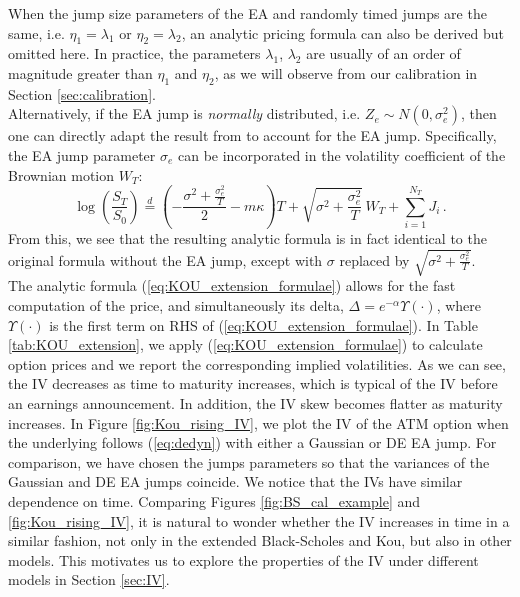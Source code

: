 \documentclass[11pt]{article}
\numberwithin{equation}{section}
\numberwithin{theorem}{section}
\begin{document}
\vspace{10pt}

When the jump size parameters of the EA and randomly timed jumps are the same, i.e. $\eta_{1}=\lambda_{1}$ or $\eta_{2}=\lambda_{2}$, an analytic pricing formula can also be  derived but omitted here. In practice, the   parameters $\lambda_1$, $\lambda_2$ are usually  of an order of magnitude greater
than $\eta_1$ and $\eta_2$, as we will observe from our  calibration in Section \ref{sec:calibration}. \\



 Alternatively, if the EA jump  is \textit{normally} distributed, i.e. $Z_{e}\sim N\left(0,\sigma_{e}^{2}\right)$, then one can directly adapt   the result from \cite{Kou2002} to account for the EA jump. Specifically, the EA jump parameter $\sigma_e$ can be incorporated in the  volatility coefficient of the Brownian motion $W_T$:
\[
{\log}\left(\frac{S_{T}}{S_{0}}\right)\overset{d}{=}\left(-\frac{\sigma^{2}+\frac{\sigma_{e}^{2}}{T}}{2}-m\kappa\right)T+\sqrt{\sigma^{2}+\frac{\sigma_{e}^{2}}{T}}\,W_{T}+\sum_{i=1}^{N_{T}}J_{i}\,.
\] 
From this, we   see that the resulting analytic formula is in fact identical to the original formula without the EA jump, except with $\sigma$ replaced by $\sqrt{\sigma^{2}+\frac{\sigma_{e}^{2}}{T}}$. \\


The analytic formula (\ref{eq:KOU_extension_formulae}) allows for the
fast computation of the price, and simultaneously its delta, $\Delta=e^{-\alpha}\Upsilon\left(\cdot\right)$,
where $\Upsilon\left(\cdot\right)$ is the first term on RHS of
(\ref{eq:KOU_extension_formulae}). In Table
\ref{tab:KOU_extension}, we apply (\ref{eq:KOU_extension_formulae}) to calculate option prices and we report the corresponding implied volatilities. As we can see, the IV decreases as time to maturity increases, which is typical of the IV before an earnings announcement. In addition,  the IV skew becomes  flatter as  maturity increases. In Figure \ref{fig:Kou_rising_IV}, we plot the IV of the ATM option when the underlying follows (\ref{eq:dedyn}) with either a Gaussian or DE EA jump. For comparison, we have chosen the jumps parameters so that the variances of the Gaussian and DE EA jumps coincide. We notice that the IVs have similar  dependence on time. Comparing Figures  \ref{fig:BS_cal_example} and \ref{fig:Kou_rising_IV}, it is natural to wonder whether the   IV increases in time in a similar fashion, not only  in the extended Black-Scholes and Kou, but also in other  models. This  motivates us to explore the properties of the IV under different models in Section \ref{sec:IV}.
\end{document}
